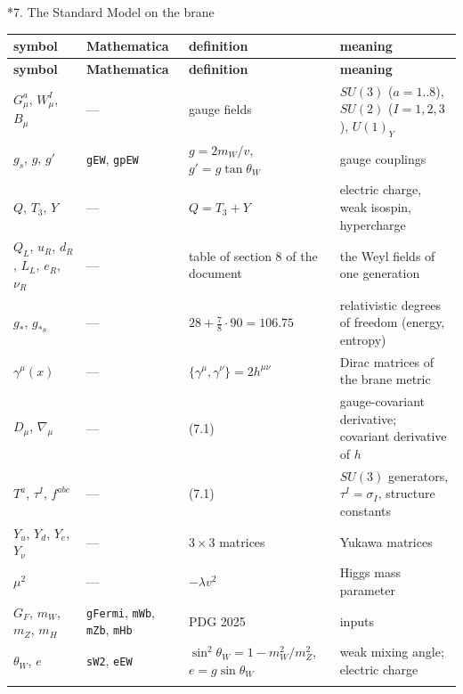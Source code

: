 \documentclass[10pt,a4paper]{article}
\makeatletter
\renewcommand\section{\@startsection{section}{1}{\z@}{-3.5ex \@plus -1ex \@minus -.2ex}{2.3ex \@plus.2ex}{\normalfont\Large\bfseries\raggedright}}
\makeatother
\begin{document}
\section*{7. The Standard Model on the brane}
{\footnotesize
\begin{longtable}{>{\raggedright\arraybackslash}p{}>{\raggedright\arraybackslash}p{}>{\raggedright\arraybackslash}p{}>{\raggedright\arraybackslash}p{}}
\toprule
\textbf{symbol} & \textbf{Mathematica} & \textbf{definition} & \textbf{meaning} \\
\midrule\endfirsthead
\toprule
\textbf{symbol} & \textbf{Mathematica} & \textbf{definition} & \textbf{meaning} \\
\midrule\endhead
\endfoot
\bottomrule\endlastfoot
$G^a_\mu$, $W^I_\mu$, $B_\mu$ & — & gauge fields & $SU(3)$ ($a=1..8$), $SU(2)$ ($I=1,2,3$), $U(1)_Y$ \\
$g_s$, $g$, $g'$ & \texttt{gEW}, \texttt{gpEW} & $g=2m_W/v$, $g'=g\tan\theta_W$ & gauge couplings \\
$Q$, $T_3$, $Y$ & — & $Q=T_3+Y$ & electric charge, weak isospin, hypercharge \\
$Q_L$, $u_R$, $d_R$, $L_L$, $e_R$, $\nu_R$ & — & table of section 8 of the document & the Weyl fields of one generation \\
$g_*$, $g_{*s}$ & — & $28+\frac78\cdot90=106.75$ & relativistic degrees of freedom (energy, entropy) \\
$\gamma^\mu(x)$ & — & $\{\gamma^\mu,\gamma^\nu\}=2h^{\mu\nu}$ & Dirac matrices of the brane metric \\
$D_\mu$, $\nabla_\mu$ & — & (7.1) & gauge-covariant derivative; covariant derivative of $h$ \\
$T^a$, $\tau^I$, $f^{abc}$ & — & (7.1) & $SU(3)$ generators, $\tau^I=\sigma_I$, structure constants \\
$Y_u$, $Y_d$, $Y_e$, $Y_\nu$ & — & $3\times3$ matrices & Yukawa matrices \\
$\mu^2$ & — & $-\lambda v^2$ & Higgs mass parameter \\
$G_F$, $m_W$, $m_Z$, $m_H$ & \texttt{gFermi}, \texttt{mWb}, \texttt{mZb}, \texttt{mHb} & PDG 2025 & inputs \\
$\theta_W$, $e$ & \texttt{sW2}, \texttt{eEW} & $\sin^2\theta_W=1-m_W^2/m_Z^2$, $e=g\sin\theta_W$ & weak mixing angle; electric charge \\*
\end{longtable}}
\end{document}

